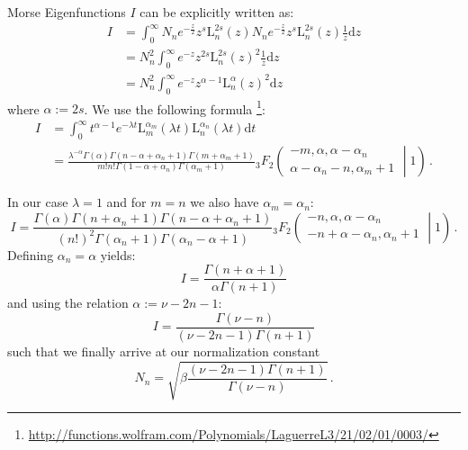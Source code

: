 \begin{chapter}{Morse Eigenfunctions}
$I$ can be explicitly written as:
\begin{equation}
  \begin{split}
    I
    & = \int_{0}^{\infty} N_{n} e^{-\frac{z}{2}} z^{s} \mathrm{L}_{n}^{2s}(z) N_{n} e^{-\frac{z}{2}} z^{s} \mathrm{L}_{n}^{2s}(z) \frac{1}{z} \mathrm{d}z \\
    & = N_{n}^{2} \int_{0}^{\infty} e^{-z} z^{2s} \mathrm{L}_{n}^{2s}(z)^{2} \frac{1}{z} \mathrm{d}z \\
    & = N_{n}^{2} \int_{0}^{\infty} e^{-z} z^{\alpha - 1} \mathrm{L}_{n}^{\alpha}(z)^{2} \mathrm{d}z
  \end{split}
\end{equation}
where $\alpha := 2s$. We use the following formula
\footnote{\url{http://functions.wolfram.com/Polynomials/LaguerreL3/21/02/01/0003/}}:
\begin{equation}
  \begin{split}
    I
    & = \int_{0}^{\infty} t^{\alpha - 1} e^{-\lambda t} \mathrm{L}_{m}^{\alpha_{m}}(\lambda t) \mathrm{L}_{n}^{\alpha_{n}}(\lambda t) \mathrm{d}t \\
    & = \frac{\lambda^{-\alpha} \Gamma(\alpha) \Gamma(n-\alpha+\alpha_{n}+1) \Gamma(m+\alpha_{m}+1)}
             {m! n! \Gamma(1-\alpha+\alpha_{n}) \Gamma(\alpha_{m}+1)}
        {}_{3}F_{2}
        \left(
          \begin{matrix}
            - m, \alpha, \alpha - \alpha_{n} \\
            \alpha - \alpha_{n} - n, \alpha_{m} + 1
          \end{matrix}
          \middle| {1} \right) \,.
  \end{split}
\end{equation}

In our case $\lambda = 1$ and for $m = n$ we also have $\alpha_{m} = \alpha_{n}$:
\begin{equation}
  I = \frac{\Gamma(\alpha) \Gamma(n+\alpha_{n}+1) \Gamma(n-\alpha+\alpha_{n}+1)}
           {(n!)^{2} \Gamma(\alpha_{n}+1) \Gamma(\alpha_{n}-\alpha+1)}
      {}_{3}F_{2}
      \left(
        \begin{matrix}
          -n, \alpha, \alpha-\alpha_{n} \\
          -n+\alpha -\alpha_{n}, \alpha_{n}+1
        \end{matrix}
      \middle| {1} \right) \,.
\end{equation}
Defining $\alpha_{n} = \alpha$ yields:
\begin{equation}
  I = \frac{\Gamma(n+\alpha+1)}{\alpha \Gamma(n+1)}
\end{equation}
and using the relation $\alpha := \nu - 2n - 1$:
\begin{equation}
  \label{eq:norm_integral}
  I = \frac{\Gamma(\nu-n)}{(\nu -2n -1) \Gamma(n+1)}
\end{equation}
such that we finally arrive at our normalization constant
\begin{equation}
  N_{n} = \sqrt{\beta \frac{(\nu -2n -1) \Gamma(n+1)}{\Gamma(\nu-n)}} \,.
\end{equation}


\end{chapter}
